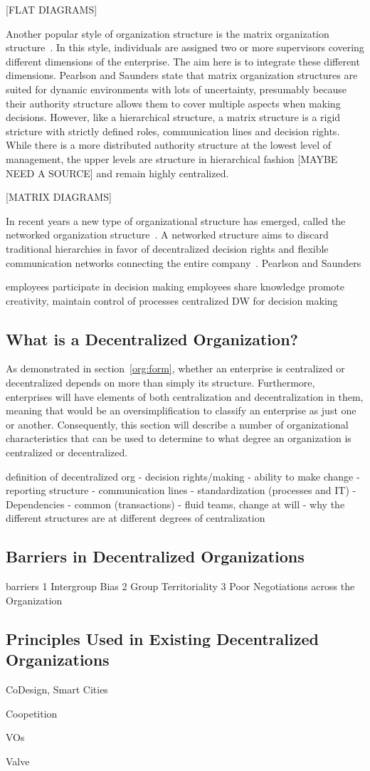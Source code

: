 [FLAT DIAGRAMS]

Another popular style of organization structure is the matrix organization structure~\cite{pearlson2009}. In this style, individuals are assigned two or more supervisors covering different dimensions of the enterprise. The aim here is to integrate these different dimensions. Pearlson and Saunders state that matrix organization structures are suited for dynamic environments with lots of uncertainty, presumably because their authority structure allows them to cover multiple aspects when making decisions. However, like a hierarchical structure, a matrix structure is a rigid stricture with strictly defined roles, communication lines and decision rights. While there is a more distributed authority structure at the lowest level of management, the upper levels are structure in hierarchical fashion [MAYBE NEED A SOURCE] and remain highly centralized.

[MATRIX DIAGRAMS]

In recent years a new type of organizational structure has emerged, called the networked organization structure~\cite{pearlson2009}. A networked structure aims to discard traditional hierarchies in favor of decentralized decision rights and flexible communication networks connecting the entire company~\cite{applegate1988,pearlson2009}. Pearlson and Saunders 

employees participate in decision making
employees share knowledge
promote creativity, maintain control of processes
centralized DW for decision making


\subsection{What is a Decentralized Organization?}

As demonstrated in section~\ref{org:form}, whether an enterprise is centralized or decentralized depends on more than simply its structure. Furthermore, enterprises will have elements of both centralization and decentralization in them, meaning that would be an oversimplification to classify an enterprise as just one or another. Consequently, this section will describe a number of organizational characteristics that can be used to determine to what degree an organization is centralized or decentralized. 


definition of decentralized org
    - decision rights/making
        - ability to make change
    - reporting structure
    - communication lines
    - standardization (processes and IT)
    - Dependencies - common (transactions)
    - fluid teams, change at will
    - why the different structures are at different degrees of centralization
    

\subsection{Barriers in Decentralized Organizations}

barriers
    1 Intergroup Bias
    2 Group Territoriality
    3 Poor Negotiations across the Organization

\subsection{Principles Used in Existing Decentralized Organizations}

CoDesign, Smart Cities

Coopetition

VOs

Valve
